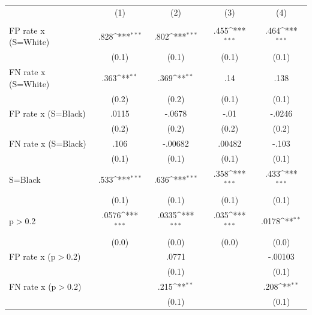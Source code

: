{
\def\sym#1{\ifmmode^{#1}\else\(^{#1}\)\fi}
\begin{tabular}{l*{4}{c}}
\hline\hline
                &\multicolumn{1}{c}{(1)}&\multicolumn{1}{c}{(2)}&\multicolumn{1}{c}{(3)}&\multicolumn{1}{c}{(4)}\\
                &\multicolumn{1}{c}{}&\multicolumn{1}{c}{}&\multicolumn{1}{c}{}&\multicolumn{1}{c}{}\\
\hline
FP rate x (S=White)&     .828\sym{***}&     .802\sym{***}&     .455\sym{***}&     .464\sym{***}\\
                &    (0.1)         &    (0.1)         &    (0.1)         &    (0.1)         \\
FN rate x (S=White)&     .363\sym{**} &     .369\sym{**} &      .14         &     .138         \\
                &    (0.2)         &    (0.2)         &    (0.1)         &    (0.1)         \\
FP rate x (S=Black)&    .0115         &   -.0678         &     -.01         &   -.0246         \\
                &    (0.2)         &    (0.2)         &    (0.2)         &    (0.2)         \\
FN rate x (S=Black)&     .106         &  -.00682         &   .00482         &    -.103         \\
                &    (0.1)         &    (0.1)         &    (0.1)         &    (0.1)         \\
S=Black         &     .533\sym{***}&     .636\sym{***}&     .358\sym{***}&     .433\sym{***}\\
                &    (0.1)         &    (0.1)         &    (0.1)         &    (0.1)         \\
p$>$0.2         &    .0576\sym{***}&    .0335\sym{***}&     .035\sym{***}&    .0178\sym{**} \\
                &    (0.0)         &    (0.0)         &    (0.0)         &    (0.0)         \\
FP rate x (p$>$0.2)&                  &    .0771         &                  &  -.00103         \\
                &                  &    (0.1)         &                  &    (0.1)         \\
FN rate x (p$>$0.2)&                  &     .215\sym{**} &                  &     .208\sym{**} \\
                &                  &    (0.1)         &                  &    (0.1)         \\

\end{tabular}}
